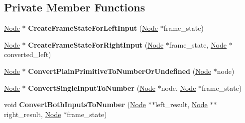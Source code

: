 \subsection*{Private Member Functions}
\begin{DoxyCompactItemize}
\item 
\hyperlink{classv8_1_1internal_1_1compiler_1_1_node}{Node} $\ast$ {\bfseries Create\+Frame\+State\+For\+Left\+Input} (\hyperlink{classv8_1_1internal_1_1compiler_1_1_node}{Node} $\ast$frame\+\_\+state)\hypertarget{classv8_1_1internal_1_1compiler_1_1_j_s_binop_reduction_ab58fd90a16a4b7b7665cc82343837426}{}\label{classv8_1_1internal_1_1compiler_1_1_j_s_binop_reduction_ab58fd90a16a4b7b7665cc82343837426}

\item 
\hyperlink{classv8_1_1internal_1_1compiler_1_1_node}{Node} $\ast$ {\bfseries Create\+Frame\+State\+For\+Right\+Input} (\hyperlink{classv8_1_1internal_1_1compiler_1_1_node}{Node} $\ast$frame\+\_\+state, \hyperlink{classv8_1_1internal_1_1compiler_1_1_node}{Node} $\ast$converted\+\_\+left)\hypertarget{classv8_1_1internal_1_1compiler_1_1_j_s_binop_reduction_aa304bb2f8057e1ad060b561206365135}{}\label{classv8_1_1internal_1_1compiler_1_1_j_s_binop_reduction_aa304bb2f8057e1ad060b561206365135}

\item 
\hyperlink{classv8_1_1internal_1_1compiler_1_1_node}{Node} $\ast$ {\bfseries Convert\+Plain\+Primitive\+To\+Number\+Or\+Undefined} (\hyperlink{classv8_1_1internal_1_1compiler_1_1_node}{Node} $\ast$node)\hypertarget{classv8_1_1internal_1_1compiler_1_1_j_s_binop_reduction_af8fcdf307f80afb1d19d7985f21d9ed8}{}\label{classv8_1_1internal_1_1compiler_1_1_j_s_binop_reduction_af8fcdf307f80afb1d19d7985f21d9ed8}

\item 
\hyperlink{classv8_1_1internal_1_1compiler_1_1_node}{Node} $\ast$ {\bfseries Convert\+Single\+Input\+To\+Number} (\hyperlink{classv8_1_1internal_1_1compiler_1_1_node}{Node} $\ast$node, \hyperlink{classv8_1_1internal_1_1compiler_1_1_node}{Node} $\ast$frame\+\_\+state)\hypertarget{classv8_1_1internal_1_1compiler_1_1_j_s_binop_reduction_a3369c6b9b2600c0e78530fddd39c2c74}{}\label{classv8_1_1internal_1_1compiler_1_1_j_s_binop_reduction_a3369c6b9b2600c0e78530fddd39c2c74}

\item 
void {\bfseries Convert\+Both\+Inputs\+To\+Number} (\hyperlink{classv8_1_1internal_1_1compiler_1_1_node}{Node} $\ast$$\ast$left\+\_\+result, \hyperlink{classv8_1_1internal_1_1compiler_1_1_node}{Node} $\ast$$\ast$right\+\_\+result, \hyperlink{classv8_1_1internal_1_1compiler_1_1_node}{Node} $\ast$frame\+\_\+state)\hypertarget{classv8_1_1internal_1_1compiler_1_1_j_s_binop_reduction_aaf6eb5e3d59bd391128d7781fa09f028}{}\label{classv8_1_1internal_1_1compiler_1_1_j_s_binop_reduction_aaf6eb5e3d59bd391128d7781fa09f028}


\end{DoxyCompactItemize}
